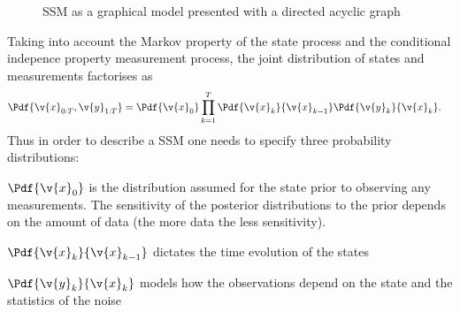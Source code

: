 \begin{figure}[!htp]
	\centering
	\caption{SSM as a graphical model presented with a directed acyclic graph}
	\label{fig:ssm_graphical}
\end{figure}
Taking into account the Markov property of the state process and the conditional
indepence property measurement process, the joint distribution of states
and measurements factorises as
\begin{align}
	\Pdf{\v{x}_{0:T},\v{y}_{1:T}}&=\Pdf{\v{x}_0}\prod_{k=1}^T\Pdf{\v{x}_k}{\v{x}_{k-1}}\Pdf{\v{y}_k}{\v{x}_{k}}
	\label{eq:joint_factorization}.
\end{align}
Thus in order to describe a SSM one needs to specify three probability distributions:
\begin{description}
\addtolength{\leftskip}{1cm}
	\item[Prior distribution]
	$\Pdf{\v{x}_0}$ is the distribution assumed for the state prior to observing any measurements. The
	sensitivity of the posterior distributions to the prior depends on the amount of data (the more data the less sensitivity).
	\item[Dynamics model]
	$\Pdf{\v{x}_k}{\v{x}_{k-1}}$ dictates the time evolution of the states
	\item[Measurement model]
	$\Pdf{\v{y}_k}{\v{x}_{k}}$ models how the observations depend on the state and the statistics of the noise
\end{description}


